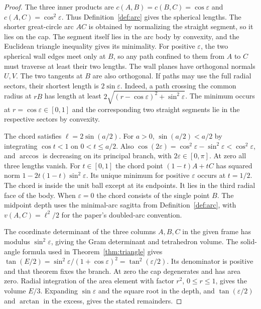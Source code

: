 \documentclass[11pt,reqno]{amsart}
\theoremstyle{definition}
\theoremstyle{remark}
\numberwithin{equation}{section}
\begin{document}
\begin{proof}
The three inner products are \(c(A,B)=c(B,C)=\cos\varepsilon\) and
\(c(A,C)=\cos^2\varepsilon\). Thus Definition~\ref{def:arc} gives the
spherical lengths. The shorter great-circle arc \(AC\) is obtained by
normalizing the straight segment, so it lies on the cap. The segment itself
lies in the arc body by convexity, and the Euclidean triangle inequality
gives its minimality. For positive \(\varepsilon\), the two spherical wall
edges meet only at \(B\), so any path confined to them from \(A\) to \(C\)
must traverse at least their two lengths. The wall planes have orthogonal
normals \(U,V\). The two tangents at \(B\) are also orthogonal.
If paths may use the full radial sectors, their shortest length is
\(2\sin\varepsilon\). Indeed, a path crossing the common radius at
\(rB\) has length at least
\(2\sqrt{(r-\cos\varepsilon)^2+\sin^2\varepsilon}\).
The minimum occurs at \(r=\cos\varepsilon\in[0,1]\) and the corresponding
two straight segments lie in the respective sectors by convexity.

The chord satisfies \(\ell=2\sin(a/2)\). For \(a>0\),
\(\sin(a/2)<a/2\) by integrating \(\cos t<1\) on \(0<t\leq a/2\).
Also \(\cos(2\varepsilon)=\cos^2\varepsilon-\sin^2\varepsilon
<\cos^2\varepsilon\), and \(\arccos\) is decreasing on its principal branch,
with \(2\varepsilon\in[0,\pi]\). At zero all three lengths vanish.
For \(t\in[0,1]\) the chord point \((1-t)A+tC\) has squared norm
\(1-2t(1-t)\sin^2\varepsilon\). Its unique minimum for positive
\(\varepsilon\) occurs at \(t=1/2\). The chord is inside the unit ball
except at its endpoints. It lies in the third radial face of the body.
When \(\varepsilon=0\) the chord consists of the single point \(B\).
The midpoint depth uses the minimal-arc sagitta from
Definition~\ref{def:arc}, with \(v(A,C)=\ell^2/2\) for the paper's
doubled-arc convention.

The coordinate determinant of the three columns \(A,B,C\) in the given
frame has modulus \(\sin^2\varepsilon\), giving the Gram determinant and
tetrahedron volume. The solid-angle formula used in
Theorem~\ref{thm:triangle} gives
\(\tan(E/2)=\sin^2\varepsilon/(1+\cos\varepsilon)^2
=\tan^2(\varepsilon/2)\). Its denominator is positive and that theorem fixes
the branch. At zero the cap degenerates and has area zero. Radial
integration of the area element with factor \(r^2\), \(0\leq r\leq1\),
gives the volume \(E/3\). Expanding \(\sin\varepsilon\) and the square root
in the depth, and \(\tan(\varepsilon/2)\) and \(\arctan\) in the excess,
gives the stated remainders.
\end{proof}
\end{document}
